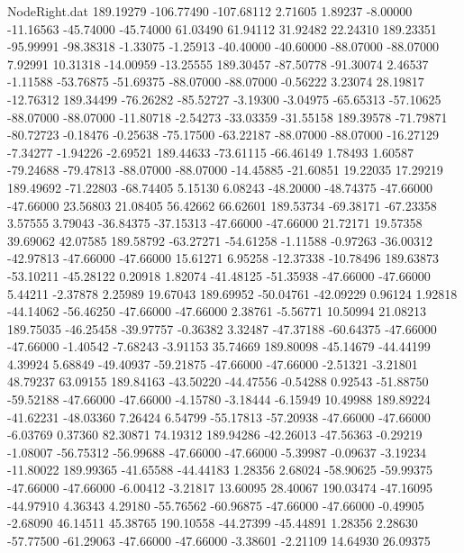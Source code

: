 \begin{filecontents}{NodeRight.dat}
 189.19279 -106.77490 -107.68112     2.71605    1.89237   -8.00000  -11.16563  -45.74000  -45.74000   61.03490   61.94112   31.92482   22.24310
 189.23351  -95.99991  -98.38318    -1.33075   -1.25913  -40.40000  -40.60000  -88.07000  -88.07000    7.92991   10.31318  -14.00959  -13.25555
 189.30457  -87.50778  -91.30074     2.46537   -1.11588  -53.76875  -51.69375  -88.07000  -88.07000   -0.56222    3.23074   28.19817  -12.76312
 189.34499  -76.26282  -85.52727    -3.19300   -3.04975  -65.65313  -57.10625  -88.07000  -88.07000  -11.80718   -2.54273  -33.03359  -31.55158
 189.39578  -71.79871  -80.72723    -0.18476   -0.25638  -75.17500  -63.22187  -88.07000  -88.07000  -16.27129   -7.34277   -1.94226   -2.69521
 189.44633  -73.61115  -66.46149     1.78493    1.60587  -79.24688  -79.47813  -88.07000  -88.07000  -14.45885  -21.60851   19.22035   17.29219
 189.49692  -71.22803  -68.74405     5.15130    6.08243  -48.20000  -48.74375  -47.66000  -47.66000   23.56803   21.08405   56.42662   66.62601
 189.53734  -69.38171  -67.23358     3.57555    3.79043  -36.84375  -37.15313  -47.66000  -47.66000   21.72171   19.57358   39.69062   42.07585
 189.58792  -63.27271  -54.61258    -1.11588   -0.97263  -36.00312  -42.97813  -47.66000  -47.66000   15.61271    6.95258  -12.37338  -10.78496
 189.63873  -53.10211  -45.28122     0.20918    1.82074  -41.48125  -51.35938  -47.66000  -47.66000    5.44211   -2.37878    2.25989   19.67043
 189.69952  -50.04761  -42.09229     0.96124    1.92818  -44.14062  -56.46250  -47.66000  -47.66000    2.38761   -5.56771   10.50994   21.08213
 189.75035  -46.25458  -39.97757    -0.36382    3.32487  -47.37188  -60.64375  -47.66000  -47.66000   -1.40542   -7.68243   -3.91153   35.74669
 189.80098  -45.14679  -44.44199     4.39924    5.68849  -49.40937  -59.21875  -47.66000  -47.66000   -2.51321   -3.21801   48.79237   63.09155
 189.84163  -43.50220  -44.47556    -0.54288    0.92543  -51.88750  -59.52188  -47.66000  -47.66000   -4.15780   -3.18444   -6.15949   10.49988
 189.89224  -41.62231  -48.03360     7.26424    6.54799  -55.17813  -57.20938  -47.66000  -47.66000   -6.03769    0.37360   82.30871   74.19312
 189.94286  -42.26013  -47.56363    -0.29219   -1.08007  -56.75312  -56.99688  -47.66000  -47.66000   -5.39987   -0.09637   -3.19234  -11.80022
 189.99365  -41.65588  -44.44183     1.28356    2.68024  -58.90625  -59.99375  -47.66000  -47.66000   -6.00412   -3.21817   13.60095   28.40067
 190.03474  -47.16095  -44.97910     4.36343    4.29180  -55.76562  -60.96875  -47.66000  -47.66000   -0.49905   -2.68090   46.14511   45.38765
 190.10558  -44.27399  -45.44891     1.28356    2.28630  -57.77500  -61.29063  -47.66000  -47.66000   -3.38601   -2.21109   14.64930   26.09375

\end{filecontents}
